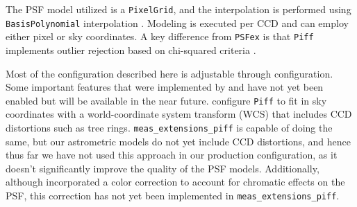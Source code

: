 The PSF model utilized is a \texttt{PixelGrid}, and the interpolation is performed using \texttt{BasisPolynomial} interpolation \citep{2021MNRAS.501.1282J}.
Modeling is executed per CCD and can employ either pixel or sky coordinates.
A key difference from \texttt{PSFex} is that  \texttt{Piff} implements outlier rejection based on chi-squared criteria \citep[see][for more details]{2021MNRAS.501.1282J}.

Most of the configuration described here is adjustable through configuration.
Some important features that were implemented by \citet{2021MNRAS.501.1282J} and \citet{2025OJAp....8E..26S} have not yet been enabled but will be available in the near future.
\citet{2021MNRAS.501.1282J} configure \texttt{Piff} to fit in sky coordinates with a world-coordinate system transform (WCS) that includes CCD distortions such as tree rings.
\texttt{meas\_extensions\_piff} is capable of doing the same, but our astrometric models do not yet include CCD distortions, and hence thus far we have not used this approach in our production configuration, as it doesn't significantly improve the quality of the PSF models.
Additionally, although \citet{2025OJAp....8E..26S} incorporated a color correction to account for chromatic effects on the PSF, this correction has not yet been implemented in  \texttt{meas\_extensions\_piff}.
